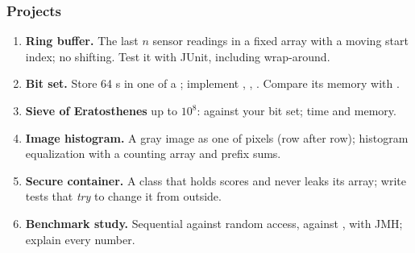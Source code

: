 \documentclass[aspectratio=169,10pt,compress]{beamer}
\begin{document}




\begin{frame}[t,fragile] \frametitle{Projects}
	\begin{enumerate}\small
		\item \textbf{Ring buffer.} The last $n$ sensor readings in a fixed array with a moving start index;
		      no shifting. Test it with JUnit, including wrap-around.
		\item \textbf{Bit set.} Store 64 s in one  of a ; implement
		      , , . Compare its memory with .
		\item \textbf{Sieve of Eratosthenes} up to $10^{8}$:  against your bit set; time and memory.
		\item \textbf{Image histogram.} A gray image as one  of pixels (row after row);
		      histogram equalization with a counting array and prefix sums.
		\item \textbf{Secure container.} A class that holds scores and never leaks its array;
		      write tests that \emph{try} to change it from outside.
		\item \textbf{Benchmark study.} Sequential against random access,  against ,
		      with JMH; explain every number.
	\end{enumerate}
\end{frame}




\end{document}
